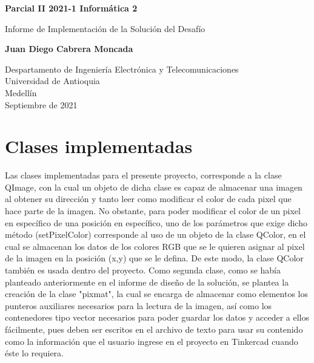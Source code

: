 \documentclass{article}
\begin{document}
\begin{titlepage}
    \begin{center}
        \vspace*{1cm}
            
        \Huge
        \textbf{Parcial II 2021-1 Informática 2}
            
        \vspace{0.5cm}
        \LARGE
        Informe de Implementación de la Solución del Desafío
            
        \vspace{1.5cm}
            
        \textbf{Juan Diego Cabrera Moncada}\\
            
        \vfill
            
        \vspace{0.8cm}
            
        \Large
        Despartamento de Ingeniería Electrónica y Telecomunicaciones\\
        Universidad de Antioquia\\
        Medellín\\
        Septiembre de 2021
            
    \end{center}
\end{titlepage}

\tableofcontents
\newpage
\section{Clases implementadas}
Las clases implementadas para el presente proyecto, corresponde a la clase QImage, con la cual un objeto de dicha clase es capaz de almacenar una imagen al obtener su dirección y tanto leer como modificar el color de cada pixel que hace parte de la imagen. No obstante, para poder modificar el color de un pixel en específico de una posición en específico, uno de los parámetros que exige dicho método (setPixelColor) corresponde al uso de un objeto de la clase QColor, en el cual se almacenan los datos de los colores RGB que se le quieren asignar al pixel de la imagen en la posición (x,y) que se le defina. De este modo, la clase QColor también es usada dentro del proyecto. Como segunda clase, como se había planteado anteriormente en el informe de diseño de la solución, se plantea la creación de la clase "pixmat", la cual se encarga de almacenar como elementos los punteros auxiliares necesarios para la lectura de la imagen, así como los contenedores tipo vector necesarios para poder guardar los datos y acceder a ellos fácilmente, pues deben ser escritos en el archivo de texto para usar su contenido como la información que el usuario ingrese en el proyecto en Tinkercad cuando éste lo requiera.
\end{document}
